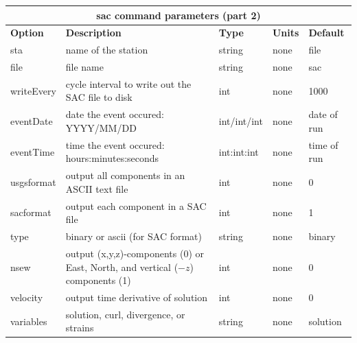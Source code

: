 \documentclass[11pt]{report}
\begin{document}
\begin{center}
\begin{tabular}{|l|p{8cm}|l|l|l|} \hline
\multicolumn{5}{|c|}{\bf sac command parameters (part 2)}\\ \hline
\bf{Option} & \bf{Description} & \bf{Type} & \bf{Units} & \bf{Default} \\ \hline \hline
sta & name of the station & string & none & file \\ \hline
file & file name  & string & none & sac \\ \hline
writeEvery & cycle interval to write out the SAC file to disk & int & none & 1000 \\ \hline
\hline
eventDate & date the event occured: YYYY/MM/DD & int/int/int & none & date of run \\ \hline
eventTime & time the event occured: hours:minutes:seconds & int:int:int & none & time of run \\ \hline
%
usgsformat & output all components in an ASCII text file & int & none & 0 \\ \hline
sacformat & output each component in a SAC file & int & none & 1 \\ \hline 
type & binary or ascii (for SAC format) & string & none & binary \\ \hline
\hline
nsew & output (x,y,z)-components (0) or East, North, and vertical ($-z$) components (1)& int & none & 0 \\ \hline
velocity & output time derivative of solution & int & none & 0 \\ \hline
variables & solution, curl, divergence, or strains & string & none & solution \\ \hline
\end{tabular}
\end{center}

\end{document}
